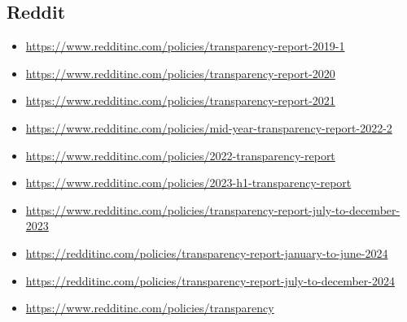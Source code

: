 {%


\subsection*{Reddit}
{\footnotesize
\begin{itemize}
\item[]\url{https://www.redditinc.com/policies/transparency-report-2019-1}
\item[]\url{https://www.redditinc.com/policies/transparency-report-2020}
\item[]\url{https://www.redditinc.com/policies/transparency-report-2021}
\item[]\url{https://www.redditinc.com/policies/mid-year-transparency-report-2022-2}
\item[]\url{https://www.redditinc.com/policies/2022-transparency-report}
\item[]\url{https://www.redditinc.com/policies/2023-h1-transparency-report}
\item[]\url{https://www.redditinc.com/policies/transparency-report-july-to-december-2023}
\item[]\url{https://redditinc.com/policies/transparency-report-january-to-june-2024}
\item[]\url{https://redditinc.com/policies/transparency-report-july-to-december-2024}
\item[]\url{https://www.redditinc.com/policies/transparency}
\end{itemize}
}


}
